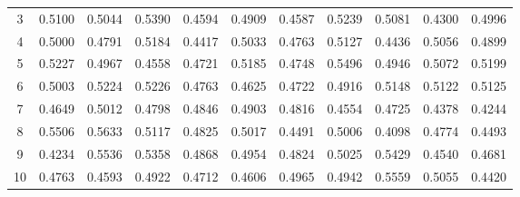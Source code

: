 \begin{tabular}{|c|cccccccccc|}
3 &   0.5100 &   0.5044 &   0.5390 &   0.4594 &   0.4909 &   0.4587 &   0.5239 &   0.5081 &   0.4300 &   0.4996  \\ 
4 &   0.5000 &   0.4791 &   0.5184 &   0.4417 &   0.5033 &   0.4763 &   0.5127 &   0.4436 &   0.5056 &   0.4899  \\ 
5 &   0.5227 &   0.4967 &   0.4558 &   0.4721 &   0.5185 &   0.4748 &   0.5496 &   0.4946 &   0.5072 &   0.5199  \\ 
6 &   0.5003 &   0.5224 &   0.5226 &   0.4763 &   0.4625 &   0.4722 &   0.4916 &   0.5148 &   0.5122 &   0.5125  \\ 
7 &   0.4649 &   0.5012 &   0.4798 &   0.4846 &   0.4903 &   0.4816 &   0.4554 &   0.4725 &   0.4378 &   0.4244  \\ 
8 &   0.5506 &   0.5633 &   0.5117 &   0.4825 &   0.5017 &   0.4491 &   0.5006 &   0.4098 &   0.4774 &   0.4493  \\ 
9 &   0.4234 &   0.5536 &   0.5358 &   0.4868 &   0.4954 &   0.4824 &   0.5025 &   0.5429 &   0.4540 &   0.4681  \\ 
10 &   0.4763 &   0.4593 &   0.4922 &   0.4712 &   0.4606 &   0.4965 &   0.4942 &   0.5559 &   0.5055 &   0.4420  \\ 
\hline \hline
\end{tabular}
